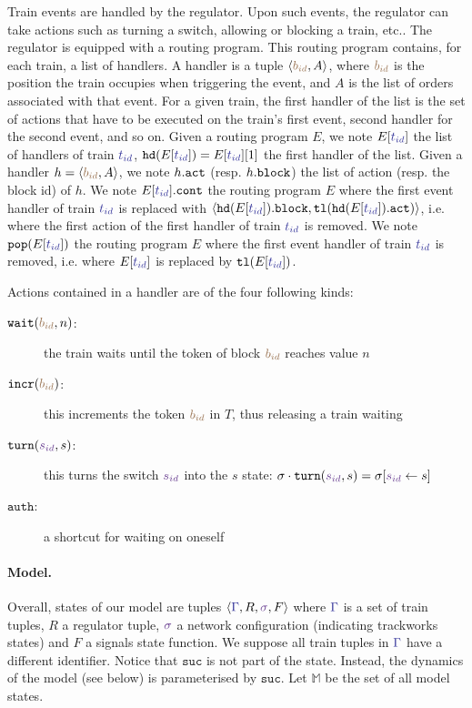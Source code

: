 \documentclass[runningheads]{llncs}
\newcommand{\tuple}[1]{\ensuremath{\langle #1\rangle}}
\newcommand{\sucblock}{{\mathtt{suc}}}
\newcommand{\modelSet}{\ensuremath{\mathbb{M}}}
\newcommand{\posFmt}[1]{{\color{poscolor}{#1}}}
\newcommand{\bid}[1]{\ensuremath{\posFmt{b_{#1}}}}
\newcommand{\swFmt}[1]{{\color{swcolor}{#1}}}
\newcommand{\sid}[1]{\ensuremath{\swFmt{s_{#1}}}}
\newcommand{\switches}{\ensuremath{\swFmt{\sigma}}}
\newcommand{\trainFmt}[1]{{\color{traincolor} #1}}
\newcommand{\trainSeq}{\ensuremath{\trainFmt{\Gamma}}\xspace}
\newcommand{\tid}[1]{\ensuremath{\trainFmt{t_{#1}}}}
\newcommand{\handlerOf}[2]{\ensuremath{#1[\trainFmt{#2}]}}
\newcommand{\popHandlerHead}[2]{\ensuremath{{\tt pop}(#1[\trainFmt{#2}])}}
\newcommand{\actionsOf}[1]{\ensuremath{#1.{\tt act}}}
\newcommand{\blockOf}[1]{\ensuremath{#1.{\tt block}}}
\newcommand{\handler}[2]{\tuple{#1, #2}}
\newcommand{\nextAct}[1]{\ensuremath{#1.{\tt cont}}}
\newcommand{\incr}[1]{{\mbox{\ensuremath{\mathtt{incr}(\posFmt{#1})}}}\xspace}
\newcommand{\turn}[2]{{\mbox{\ensuremath{\mathtt{turn}(#1, #2)}}}\xspace}
\newcommand{\auth}{{\mbox{\ensuremath{\mathtt{auth}}}}\xspace}
\newcommand{\regulator}{\ensuremath{R}}
\newcommand{\wait}[2]{{\mbox{\ensuremath{\mathtt{wait}(\posFmt{#1}, #2)}}}\xspace}
\newcommand{\signals}{\ensuremath{F}}
\newcommand{\bufferFmt}[1]{#1}
\newcommand{\head}[1]{\ensuremath{{\tt hd}(#1)}}
\newcommand{\buftail}[1]{\ensuremath{{\tt tl}(\bufferFmt{#1})}}
\begin{document}
Train events are handled by the regulator. Upon such events, the regulator can take actions such as turning a switch, allowing or blocking a train, etc.. The regulator is equipped with a routing program. This routing program contains, for each train, a list of handlers. A handler is a tuple $\tuple{\bid{id}, A}$, where $\bid{id}$ is the position the train occupies when triggering the event, and $A$ is the list of orders associated with that event. For a given train, the first handler of the list is the set of actions that have to be executed on the train's first event, second handler for the second event, and so on.
Given a routing program $E$, we note $\handlerOf{E}{\tid{id}}$ the list of handlers of train $\tid{id}$, $\head{\handlerOf{E}{\tid{id}}} = \handlerOf{E}{\tid{id}}[1]$ the first handler of the list. Given a handler $h = \tuple{\bid{id}, A}$, we note $\actionsOf{h}$ (resp. \blockOf{h}) the list of action (resp. the block id) of $h$. We note $\nextAct{\handlerOf{E}{\tid{id}}}$ the routing program $E$ where the first event handler of train $\tid{id}$ is replaced with $\handler{\blockOf{\head{\handlerOf{E}{\tid{id}}}}}{\buftail{\actionsOf{\head{\handlerOf{E}{\tid{id}}}}}}$, i.e. where the first action of the first handler of train \tid{id} is removed. We note $\popHandlerHead{E}{\tid{id}}$ the routing program $E$ where the first event handler of train \tid{id} is removed, i.e. where $\handlerOf{E}{\tid{id}}$ is replaced by $\buftail{\handlerOf{E}{\tid{id}}}$.

Actions contained in a handler are of the four following kinds:
\begin{description}
	\item [\wait{\bid{id}}{n}:] the train waits until the token of block \bid{id} reaches value $n$
	\item [\incr{\bid{id}}:] this increments the token $\bid{id}$ in $T$, thus releasing a train waiting
	\item [\turn{\sid{id}}{s}:] this turns the switch $\sid{id}$ into the $s$ state: $\sigma\cdot\turn{\sid{id}}{s} = \sigma[\sid{id} \leftarrow s]$
	\item [\auth:] a shortcut for waiting on oneself
\end{description}

\paragraph{Model.}
Overall, states of our model are tuples $\tuple{\trainSeq, \regulator, \switches, \signals}$ where $\trainSeq$ is a set of train tuples, $\regulator$ a regulator tuple, $\switches$ a network configuration (indicating trackworks states) and $\signals$ a signals state function. We suppose all train tuples in $\trainSeq$ have a different identifier. Notice that $\sucblock$ is not part of the state. Instead, the dynamics of the model (see below) is parameterised by $\sucblock$. Let $\modelSet$ be the set of all model states.
\end{document}
